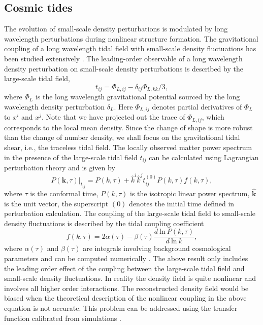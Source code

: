 \documentclass[prd,superscriptaddress,floatfix,notitlepage,nofootinbib,reprint]{revtex4-1}
\newcommand{\mr}{\mathrm}
\newcommand{\bmk}{\bm{k}}
\newcommand{\bea}{\begin{equation}}
\newcommand{\eea}{\end{equation}}
\begin{document}
\subsection{Cosmic tides}

The evolution of small-scale density perturbations is modulated by long 
wavelength perturbations during nonlinear structure formation. 
The gravitational coupling of a long wavelength tidal field with small-scale
density fluctuations has been studied extensively \cite{2014Tides}.
The leading-order observable of a long wavelength density perturbation on 
small-scale density perturbations is described by the large-scale tidal field,
\bea    
t_{ij}=\Phi_{L,ij}-\delta_{ij}\Phi_{L,kk}/3,
\eea
where $\Phi_L$ is the long wavelength gravitational potential sourced by the 
long wavelength density perturbation $\delta_L$. Here $\Phi_{L,ij}$ denotes
partial derivatives of $\Phi_L$ to $x^i$ and $x^j$.
Note that we have projected out the trace of $\Phi_{L,ij}$, which corresponds 
to the local mean density.
Since the change of shape is more robust than the change of number density, we 
shall focus on the gravitational tidal shear, i.e., the traceless tidal field.
The locally observed matter power spectrum in the presence of the large-scale
tidal field $t_{ij}$ can be calculated using Lagrangian perturbation theory 
and is given by
\bea
\label{eq:pk}
P(\bmk,\tau)|_{t_{ij}}=P(k,\tau)+\hat{k}^i\hat{k}^jt^{(0)}_{ij}P(k,\tau)f(k,\tau),
\eea
where $\tau$ is the conformal time, $P(k,\tau)$ is the isotropic linear power 
spectrum, $\hat{\bmk}$ is the unit vector, the superscript $(0)$ denotes the 
initial time defined in perturbation calculation. 
The coupling of the large-scale tidal field to small-scale density fluctuations
is described by the tidal coupling coefficient
\bea
f(k,\tau)=2\alpha(\tau)-\beta(\tau)\frac{d\:\mr{ln}\:P(k,\tau)}{d\:\mr{ln}\:k},
\eea
where $\alpha(\tau)$ and $\beta(\tau)$ are integrals involving background cosmological parameters and can be computed numerically \cite{2014Tides, 2016Tides}.
The above result only includes the leading order effect of the coupling between
the large-scale tidal field and small-scale density fluctuations. 
In reality the density field is quite nonlinear and involves all higher order 
interactions. 
The reconstructed density field would be biased when the theoretical description
of the nonlinear coupling in the above equation is not accurate.
This problem can be addressed using the transfer function calibrated from 
simulations \cite{2016Tides}. 
\end{document}
